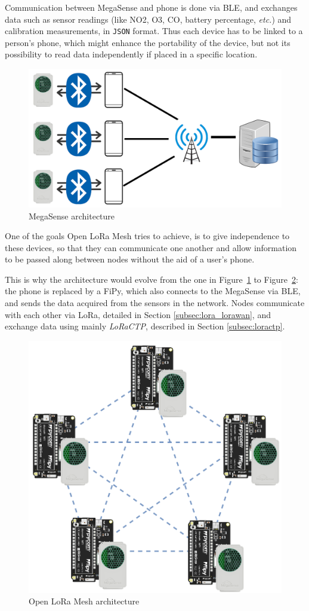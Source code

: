 		Communication between MegaSense and phone is done via BLE, and exchanges data such as sensor readings (like NO2,
		O3, CO, battery percentage, \textit{etc.}) and calibration measurements, in \texttt{JSON} format.
		Thus each device has to be linked to a person's phone, which might enhance the portability of the device, but not its possibility to read data independently if placed in a specific location.
		
		\begin{figure}[h]
			\centering
			\includegraphics[width=.75\textwidth]{resources/img/chap5/architecture_megasense}
			\caption{MegaSense architecture}
			\label{img:megasense_architecture}
		\end{figure}
	
		One of the goals Open LoRa Mesh tries to achieve, is to give independence to these devices, so that they can communicate one another and allow information to be passed along between nodes without the aid of a user's phone.
	
		This is why the architecture would evolve from the one in Figure~\ref{img:megasense_architecture} to Figure~\ref{img:openmesh_architecture}: the phone is replaced by a FiPy, which also connects to the MegaSense via BLE, and sends the data acquired from the sensors in the network.
		Nodes communicate with each other via LoRa, detailed in Section \ref{subsec:lora_lorawan}, and exchange data using mainly \textit{LoRaCTP}, described in Section \ref{subsec:loractp}.
		
		\begin{figure}[h]
			\centering
			\includegraphics[width=.7\textwidth]{resources/img/chap5/mesh-architecture-1}
			\caption{Open LoRa Mesh architecture}
			\label{img:openmesh_architecture}
		\end{figure}
		

